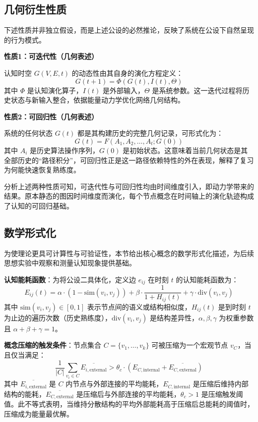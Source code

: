 \documentclass[12pt,a4paper]{article}
\begin{document}
\subsection{几何衍生性质}

下述性质并非独立假设，而是上述公设的必然推论，反映了系统在公设下自然呈现的行为模式。

\textbf{性质1：可迭代性（几何表述）}

认知时空 $G(V,E,t)$ 的动态性由其自身的演化方程定义：
\begin{equation}
G(t+1) = \Phi(G(t), I(t), \Theta)
\end{equation}
其中 $\Phi$ 是认知演化算子，$I(t)$ 是外部输入，$\Theta$ 是系统参数。这一迭代过程将历史状态与新输入整合，依据能量动力学优化网络几何结构。

\textbf{性质2：可回归性（几何表述）}

系统的任何状态 $G(t)$ 都是其构建历史的完整几何记录，可形式化为：
\begin{equation}
G(t) = F(A_1, A_2, \ldots, A_t; G(0))
\end{equation}
其中 $A_i$ 是历史算法操作序列，$G(0)$ 是初始状态。这意味着当前几何状态是其全部历史的“路径积分”，可回归性正是这一路径依赖特性的外在表现，解释了复习为何能快速恢复熟练度。

分析上述两种性质可知，可迭代性与可回归性均由时间维度引入，即动力学带来的结果。原本静态的图因时间维度而演化，每个节点概念在时间轴上的演化轨迹构成了认知的可回归基础。

\subsection{数学形式化}
为使理论更具可计算性与可验证性，本节给出核心概念的数学形式化描述，为后续思想实验中观察和测量认知现象提供基础。

\textbf{认知能耗函数}：为将公设二具体化，定义边 $e_{ij}$ 在时刻 $t$ 的认知能耗函数为：
\begin{equation}
E_{ij}(t) = \alpha \cdot (1 - \text{sim}(v_i, v_j)) + \beta \cdot \frac{1}{1 + H_{ij}(t)} + \gamma \cdot \text{div}(v_i, v_j)
\label{eq:energy_function}
\end{equation}
其中 $\text{sim}(v_i, v_j) \in [0, 1]$ 表示节点间的语义或结构相似度，$H_{ij}(t)$ 是到时刻 $t$ 为止边的遍历次数（历史熟练度），$\text{div}(v_i, v_j)$ 是结构差异性，$\alpha, \beta, \gamma$ 为权重参数且 $\alpha + \beta + \gamma = 1$。

\textbf{概念压缩的触发条件}：节点集合 $C = \{v_1, \ldots, v_k\}$ 可被压缩为一个宏观节点 $v_C$，当且仅当满足：
\begin{equation}
\frac{1}{|C|}\sum_{v_i \in C} \overline{E_{i, \text{external}}} > \theta_c \cdot (E_{C, \text{internal}} + \overline{E_{C, \text{external}}})
\label{eq:compression_condition}
\end{equation}
其中 $\overline{E_{i, \text{external}}}$ 是 $C$ 内节点与外部连接的平均能耗，$E_{C, \text{internal}}$ 是压缩后维持内部结构的能耗，$\overline{E_{C, \text{external}}}$ 是压缩后与外部连接的平均能耗，$\theta_c > 1$ 是压缩触发阈值。此不等式表明，当维持分散结构的平均外部能耗高于压缩后总能耗的阈值时，压缩成为能量最优解。
\end{document}
